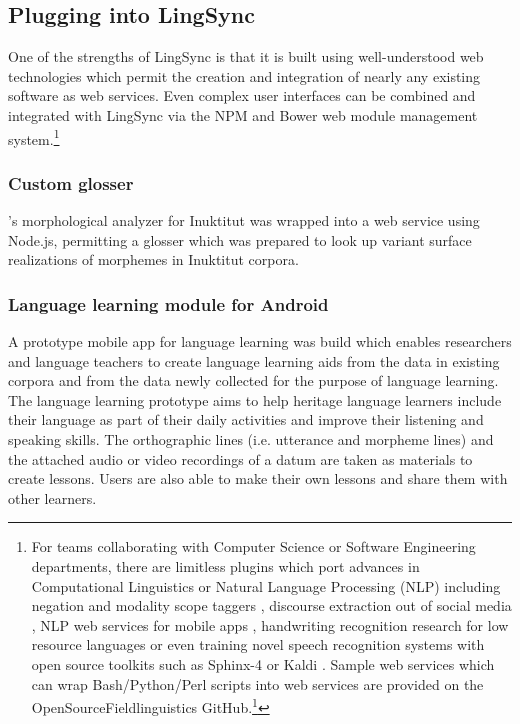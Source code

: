 \documentclass[letterpaper, 12pt, dvips]{mitwpl}
\begin{document}
\subsection{Plugging into LingSync}
\label{sec:plugins}


One of the strengths of LingSync is that it is built using well-understood web technologies which permit the creation and integration of nearly any existing software as web services. 
Even complex user interfaces can be combined and integrated with LingSync via the NPM and Bower web module management system.\footnote{
For teams collaborating with Computer Science or Software Engineering departments, there are limitless plugins which port advances in Computational Linguistics  \citep{Chen:2011}  or Natural Language Processing (NLP) including  negation and modality scope taggers  \citep{Rosenberg:2012}, %
discourse extraction out of social media  \citep{Dubuc:2010},  
NLP web services for mobile apps \citep{Sateli:2013},
 handwriting recognition research for low resource languages \citep{Sadri:2007} or even training novel speech recognition systems with
 open source toolkits such as Sphinx-4 \citep{Walker:2004} or Kaldi \citep{Povey:2011}.
Sample web services which can wrap Bash/Python/Perl scripts  into web services are provided on the OpenSourceFieldlinguistics GitHub.\footnote{https://github.com/OpenSourceFieldlinguistics} %
}

\subsubsection{Custom glosser}

\cite{Farley:2014:Online}'s morphological analyzer for Inuktitut was wrapped into a web service using Node.js, permitting a glosser which was prepared to look up variant  surface realizations of morphemes in Inuktitut corpora.

\subsubsection{Language learning module for Android}

A prototype mobile app for language learning was build which  enables researchers and language teachers to create language learning aids from the data in existing corpora and from the data newly collected for the purpose of language learning.
The language learning prototype aims to help heritage language learners include their language as part of their daily activities and improve their listening and speaking skills.
The orthographic lines (i.e.
utterance and morpheme lines) and the attached audio or video recordings of a datum are taken as materials to create lessons. Users are also able to make their own lessons and share them with other learners.
\end{document}

